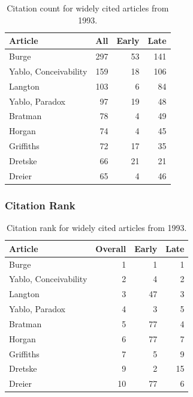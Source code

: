 \documentclass[
  10pt,
  letterpaper,
  DIV=11,
  numbers=noendperiod,
  twoside]{scrartcl}
\begin{document}
\begin{longtable}[]{@{}lrrr@{}}

\caption{\label{tbl-citation-count-1993}Citation count for widely cited
articles from 1993.}

\tabularnewline

\toprule\noalign{}
Article & All & Early & Late \\
\midrule\noalign{}
\endhead
\bottomrule\noalign{}
\endlastfoot
Burge & 297 & 53 & 141 \\
Yablo, Conceivability & 159 & 18 & 106 \\
Langton & 103 & 6 & 84 \\
Yablo, Paradox & 97 & 19 & 48 \\
Bratman & 78 & 4 & 49 \\
Horgan & 74 & 4 & 45 \\
Griffiths & 72 & 17 & 35 \\
Dretske & 66 & 21 & 21 \\
Dreier & 65 & 4 & 46 \\

\end{longtable}

\subsubsection*{Citation Rank}\label{sec-rank-1993}

\begin{longtable}[]{@{}lrrr@{}}

\caption{\label{tbl-citation-rank-1993}Citation rank for widely cited
articles from 1993.}

\tabularnewline

\toprule\noalign{}
Article & Overall & Early & Late \\
\midrule\noalign{}
\endhead
\bottomrule\noalign{}
\endlastfoot
Burge & 1 & 1 & 1 \\
Yablo, Conceivability & 2 & 4 & 2 \\
Langton & 3 & 47 & 3 \\
Yablo, Paradox & 4 & 3 & 5 \\
Bratman & 5 & 77 & 4 \\
Horgan & 6 & 77 & 7 \\
Griffiths & 7 & 5 & 9 \\
Dretske & 9 & 2 & 15 \\
Dreier & 10 & 77 & 6 \\

\end{longtable}
\end{document}
